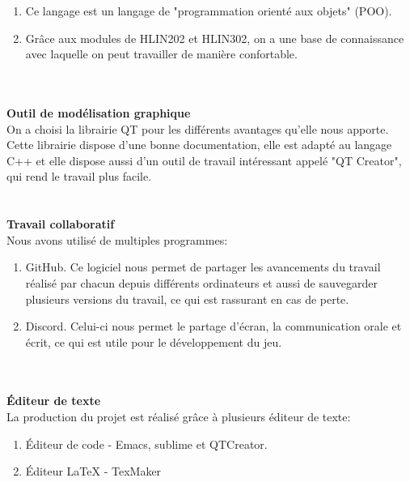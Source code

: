 \documentclass{article}
\begin{document}
\begin{enumerate}
\item Ce langage est un langage de "programmation orienté aux objets" (POO).
\item Grâce aux modules de HLIN202 et HLIN302, on a une base de connaissance avec laquelle on peut travailler de manière confortable.
\end{enumerate}
~\\~\\
\textbf{\large Outil de modélisation graphique}\\
On a choisi la librairie QT pour les différents avantages qu'elle nous apporte. Cette librairie dispose d'une bonne documentation, elle est adapté au langage C++ et elle dispose aussi d'un outil de travail intéressant appelé "QT Creator", qui rend le travail plus facile.\\~\\~\\
\textbf{\large Travail collaboratif}\\
Nous avons utilisé de multiples programmes:
\begin{enumerate}
\item GitHub. Ce logiciel nous permet de partager les avancements du travail réalisé par chacun depuis différents ordinateurs et aussi de sauvegarder plusieurs versions du travail, ce qui est rassurant en cas de perte.
\item Discord. Celui-ci nous permet le partage d'écran, la communication orale et écrit, ce qui est utile pour le développement du jeu.
\end{enumerate}
~\\~\\
\textbf{\large Éditeur de texte}\\
La production du projet est réalisé grâce à plusieurs éditeur de texte:
\begin{enumerate}
\item Éditeur de code -
Emacs, sublime et QTCreator.
\item Éditeur \LaTeX{} - TexMaker
\end{enumerate} 
\newpage
\end{document}

